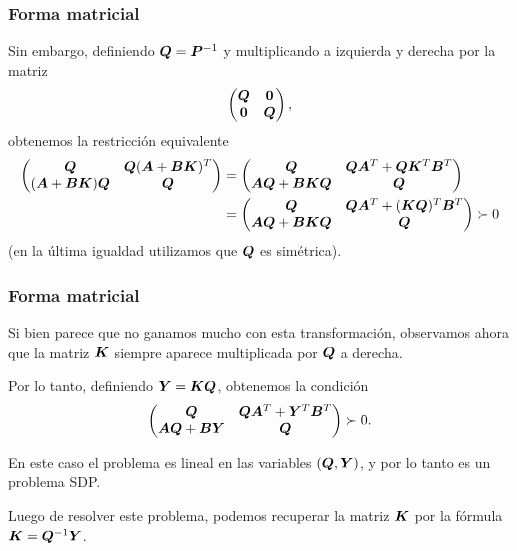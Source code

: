 \documentclass[aspectratio=169,12pt,spanish]{beamer}
\begin{document}

\begin{frame}
\frametitle{Forma matricial}
Sin embargo, definiendo $\bm{Q} = \bm{P}^{-1}$ y multiplicando a izquierda y derecha por la matriz
$$
\begin{pmatrix}
\bm{Q} & \bm{0}  \\
\bm{0} & \bm{Q}
\end{pmatrix},
$$
obtenemos la restricción equivalente
$$\begin{aligned}
\begin{pmatrix}
\bm{Q} & \bm{Q}(\bm{A}+\bm{B}\bm{K})^T  \\
(\bm{A} + \bm{B}\bm{K})\bm{Q} & \bm{Q}
\end{pmatrix} &=
\begin{pmatrix}
\bm{Q} & \bm{Q}\bm{A}^T + \bm{Q}\bm{K}^T\bm{B}^T  \\
\bm{A}\bm{Q} + \bm{B}\bm{K}\bm{Q} & \bm{Q}
\end{pmatrix} \\
&=
\begin{pmatrix}
\bm{Q} & \bm{Q}\bm{A}^T + (\bm{K}\bm{Q})^T\bm{B}^T  \\
\bm{A}\bm{Q} + \bm{B}\bm{K}\bm{Q} & \bm{Q}
\end{pmatrix} \succ 0
\end{aligned}
$$
(en la última igualdad utilizamos que $\bm{Q}$ es simétrica).


\end{frame}


\begin{frame}
\frametitle{Forma matricial}

Si bien parece que no ganamos mucho con esta transformación, observamos ahora que la matriz $\bm{K}$ siempre aparece multiplicada por $\bm{Q}$ a derecha.

Por lo tanto, definiendo $\bm{Y} = \bm{K}\bm{Q}$, obtenemos la condición
\begin{equation}
\label{eq:QY}
\begin{pmatrix}
\bm{Q} & \bm{Q}\bm{A}^T + \bm{Y}^T\bm{B}^T  \\
\bm{A}\bm{Q} + \bm{B}\bm{Y} & \bm{Q}
\end{pmatrix}  \succ 0.
\end{equation}

En este caso el problema es lineal en las variables $(\bm{Q}, \bm{Y})$, y por lo tanto es un problema SDP.

Luego de resolver este problema, podemos recuperar la matriz $\bm{K}$ por la fórmula $\bm{K} = \bm{Q}^{-1}\bm{Y}$.

\end{frame}
\end{document}
